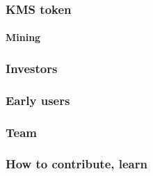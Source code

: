 \documentclass[xetex,mathsans,sans]{beamer}
\begin{document}
    \begin{frame}
        \frametitle{KMS token}
        \framesubtitle{Mining}
    \end{frame}

    \begin{frame}
        \frametitle{Investors}
    \end{frame}

    \begin{frame}
        \frametitle{Early users}
    \end{frame}

    \begin{frame}
        \frametitle{Team}
    \end{frame}

    \begin{frame}
        \frametitle{How to contribute, learn}
    \end{frame}
\end{document}
